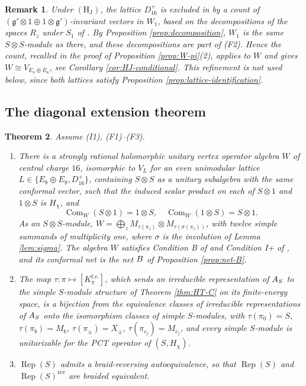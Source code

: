 \documentclass[leqno]{article}
\let\cal\relax
\newcommand{\cal}{\mathcal}
\newcommand{\co}{\colon}
\newcommand{\ot}{\otimes}
\DeclareMathOperator{\Rep}{Rep}
\newtheorem{thm}{Theorem}[section]
\newtheorem{remark}[thm]{Remark}
\numberwithin{equation}{section}
\begin{document}
\begin{remark}\normalfont
\label{rem:which-lattice}
Under $\mathrm{(H_J)}$, the lattice $D_{16}^+$ is excluded in \cite[proof of Proposition 7.12(2)]{ArhII} by a count of $(\mathfrak g' \ot 1 \oplus 1 \ot \mathfrak g')$-invariant vectors in $W_1$, based on the decompositions of the spaces $R_z$ under $S_1$ of \cite[Table 2]{Arh26}. By Proposition \ref{prop:decomposition}, $W_1$ is the same $S \ot S$-module as there, and these decompositions are part of (F2). Hence the count, recalled in the proof of Proposition \ref{prop:W-pi}(2), applies to $W$ and gives $W \cong V_{E_8 \oplus E_8}$, see Corollary \ref{cor:HJ-conditional}. This refinement is not used below, since both lattices satisfy Proposition \ref{prop:lattice-identification}.
\end{remark}


\subsection{The diagonal extension theorem}
\label{subsec:theorem-N}

\begin{thm}
\label{thm:net-diagonal}
Assume \textup{(I1)}, \textup{(F1)}--\textup{(F3)}.
\begin{enumerate}
\item There is a strongly rational holomorphic unitary vertex operator algebra $W$ of central charge $16$, isomorphic to $V_L$ for an even unimodular lattice $L \in \{E_8 \oplus E_8, D_{16}^+\}$, containing $S \ot S$ as a unitary subalgebra with the same conformal vector, such that the induced scalar product on each of $S \ot 1$ and $1 \ot S$ is $H_\chi$, and
\[
\operatorname{Com}_W(S \ot 1) = 1 \ot S,
\quad
\operatorname{Com}_W(1 \ot S) = S \ot 1.
\]
As an $S \ot S$-module, $W = \bigoplus_z M_{\tau(\pi_z)} \ot M_{\tau(\sigma(\pi_z))}$, with twelve simple summands of multiplicity one, where $\sigma$ is the involution of Lemma \ref{lem:sigma}. The algebra $W$ satisfies Condition B of \cite{Gui26} and Condition I+ of \cite{Gui25}, and its conformal net is the net $\cal B$ of Proposition \ref{prop:net-B}.
\item The map $\tau \co \pi \mapsto [K_\pi^{\mathrm{f.e.}}]$, which sends an irreducible representation of $\cal A_S$ to the simple $S$-module structure of Theorem \ref{thm:HT-C} on its finite-energy space, is a bijection from the equivalence classes of irreducible representations of $\cal A_S$ onto the isomorphism classes of simple $S$-modules, with $\tau(\pi_0) = S$, $\tau(\pi_b) = M_b$, $\tau(\pi_\pm) = X_\pm$, $\tau(\pi_{c_j}) = M_{c_j}$, and every simple $S$-module is unitarizable for the PCT operator of $(S,H_\chi)$.
\item $\Rep(S)$ admits a braid-reversing autoequivalence, so that $\Rep(S)$ and $\Rep(S)^{\mathrm{rev}}$ are braided equivalent.
\end{enumerate}
\end{thm}
\end{document}
